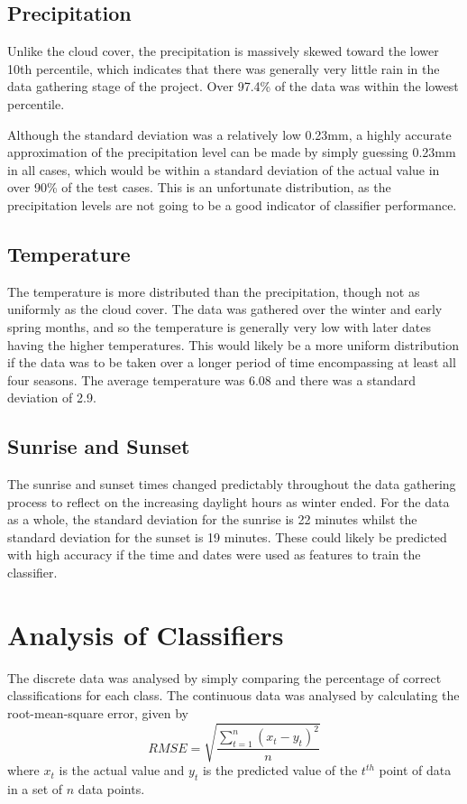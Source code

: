\documentclass[a4paper,12pt,twoside]{report}
\begin{document}
\subsection{Precipitation}


Unlike the cloud cover, the precipitation is massively skewed toward the lower 10th percentile, which indicates that there was generally very little rain in the data gathering stage of the project. Over 97.4\% of the data was within the lowest percentile.

Although the standard deviation was a relatively low 0.23mm, a highly accurate approximation of the precipitation level can be made by simply guessing 0.23mm in all cases, which would be within a standard deviation of the actual value in over 90\% of the test cases. This is an unfortunate distribution, as the precipitation levels are not going to be a good indicator of classifier performance.

\subsection{Temperature}

The temperature is more distributed than the precipitation, though not as uniformly as the cloud cover. The data was gathered over the winter and early spring months, and so the temperature is generally very low with later dates having the higher temperatures. This would likely be a more uniform distribution if the data was to be taken over a longer period of time encompassing at least all four seasons. The average temperature was 6.08\celsius{} and there was a standard deviation of 2.9\celsius.

\subsection{Sunrise and Sunset}
The sunrise and sunset times changed predictably throughout the data gathering process to reflect on the increasing daylight hours as winter ended.
For the data as a whole, the standard deviation for the sunrise is 22 minutes whilst the standard deviation for the sunset is 19 minutes. These could likely be predicted with high accuracy if the time and dates were used as features to train the classifier. 

\section{Analysis of Classifiers}
The discrete data was analysed by simply comparing the percentage of correct classifications for each class.
The continuous data was analysed by calculating the root-mean-square error, given by
$$RMSE = \sqrt{\frac{\sum_{t=1}^n (x_t - y_t)^2}{n}}$$
where $x_t$ is the actual value and $y_t$ is the predicted value of the $t^{th}$ point of data in a set of $n$ data points.
\end{document}
